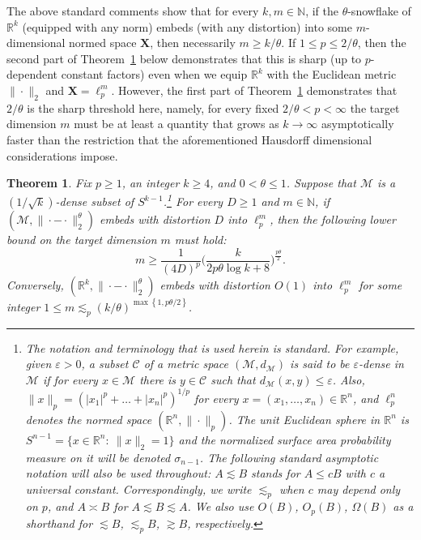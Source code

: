 \documentclass[11pt,reqno]{amsart}
\newtheorem{theorem}{Theorem}
\newcommand{\R}{\mathbb{R}}
\newcommand{\N}{\mathbb{N}}
\newcommand{\lesim}{\lesssim}
\renewcommand{\le}{\leqslant}
\renewcommand{\ge}{\geqslant}
\newcommand{\X}{\mathbf X}
\newcommand{\MM}{\mathcal{M}}
\newcommand{\sub}{\mathscr{C}}
\newcommand{\e}{\varepsilon}
\newcommand{\1}{\mathbf{1}}
\begin{document}
The above standard comments show  that for every $k,m\in \N$, if the $\theta$-snowflake of $\R^k$ (equipped with any norm) embeds (with any distortion) into some $m$-dimensional normed space $\X$, then necessarily $m\ge k/\theta$. If $1\le p\le 2/\theta$, then the second part of  Theorem~\ref{thm:transition} below demonstrates that this is sharp (up to $p$-dependent constant factors) even when we equip $\R^k$ with the Euclidean metric $\|\cdot\|_2$ and  $\X=\ell_p^m$. However, the first part of Theorem~\ref{thm:transition} demonstrates that $2/\theta$ is the sharp threshold here, namely, for every fixed $2/\theta<p<\infty$  the target dimension $m$ must be at least a quantity that grows as $k\to\infty$  asymptotically faster  than the restriction that the aforementioned Hausdorff dimensional considerations  impose. 


\begin{theorem}\label{thm:transition} 
Fix $p\ge 1$, an integer $k\ge 4$, and $0<\theta\le 1$. Suppose that $\MM$ is a $(1/\sqrt{k})$-dense subset of $S^{k-1}$.\footnote{The  notation and terminology that is used herein is standard. For example, given $\e>0$, a subset $\sub$ of a metric space $(\MM,d_\MM)$ is said to be $\e$-dense in $\MM$ if for every $x\in \MM$ there is $y\in \sub$ such that $d_\MM(x,y)\le \e$. Also,  $\|x\|_p=(|x_1|^p+\ldots+|x_n|^p)^{1/p}$ for every $x=(x_1,\ldots,x_n)\in \R^n$, and $\ell_p^n$ denotes the normed space $(\R^n,\|\cdot\|_p)$. The unit Euclidean sphere in $\R^n$ is $S^{n-1}=\{x\in \R^n:\ \|x\|_2=1\}$ and the normalized surface area probability measure on it will be denoted $\sigma_{n-1}$. The following standard asymptotic notation will also be used throughout:  $A\lesssim B$ stands for $A\le c B$ with $c$ a universal constant.  Correspondingly, we write $\lesssim_p$ when $c$ may depend only on $p$, and $A\asymp B$ for
$A\lesssim B\lesssim A$. We also use $O(B)$, $O_p (B)$, $\Omega(B)$ as a shorthand for $\lesim B$, $\lesim_p B$, $\gtrsim B$, respectively. } For every $D\ge1$ and $m\in \N$, if $(\MM,\|\cdot-\cdot\|_2^\theta)$ embeds with distortion $D$ into $\ell_p^m$, then the following lower bound on the target dimension $m$ must hold:
\begin{equation}\label{eq:snow-lower}
    m\ge\frac{1}{(4D)^p}\bigg(\frac{k}{2p\theta\log k+8}\bigg)^{\frac{p\theta}{2}}.
\end{equation}
  Conversely, $(\R^k,\|\cdot-\cdot \|_2^\theta)$ embeds with distortion $O(1)$ into $\ell_p^m$ for some integer $1\le m\lesssim_p (k/\theta)^{\max\left\{1,p\theta/2\right\}}$.
\end{theorem}
\end{document}
